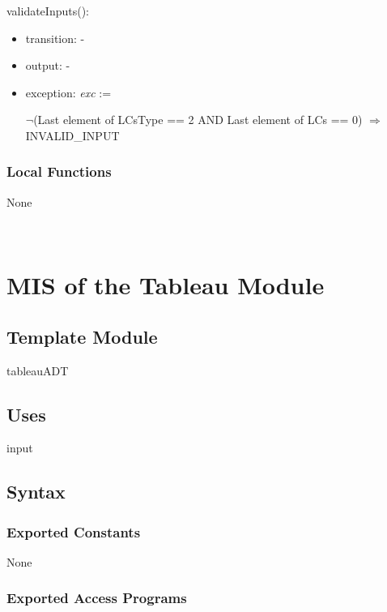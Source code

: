 \documentclass[12pt, titlepage]{article}
\begin{document}
\noindent 
validateInputs():
\begin{itemize}
	\item transition: -
	\item output: -
	\item exception: \textit{exc} := 
	
	$\neg$(Last element of LCsType == 2 AND  Last element of LCs == 0) 
	$\Rightarrow$ INVALID{\_}INPUT \\
	
	
\end{itemize}

\subsubsection{Local Functions}

None

~\newpage

\section{MIS of the Tableau Module} \label{M_Tableau} 

\subsection{Template Module}

tableauADT

\subsection{Uses}

input

\subsection{Syntax}

\subsubsection{Exported Constants}

None

\subsubsection{Exported Access Programs}
\end{document}
